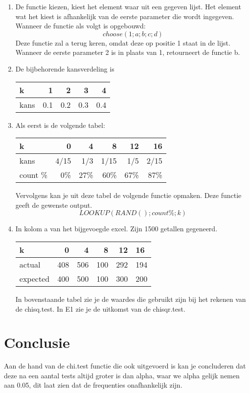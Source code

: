 \documentclass{article}
\begin{document}
\begin{enumerate}[label=(\Alph*)]
\item De functie kiezen, kiest het element waar uit een gegeven lijst. Het element wat het kiest is afhankelijk van de eerste parameter die wordt ingegeven. Wanneer de functie als volgt is opgebouwd:  
  \begin{equation}choose(1;a;b;c;d)\end{equation}
  Deze functie zal a terug keren, omdat deze op positie 1 staat in de lijst. Wanneer de eerste parameter 2 is in plaats van 1, retourneert de functie b.
\item  De bijbehorende kansverdeling is

\begin{table}[h]
  \begin{tabular}{|l|r|r|r|r|}
      \hline
      k & 1 & 2 & 3 & 4 \\ \hline
      kans & 0.1 & 0.2 & 0.3 & 0.4 \\ 
      \hline
  \end{tabular}
\end{table}

\item Als eerst is de volgende tabel:

\begin{table}[h]
  \begin{tabular}{|l|r|r|r|r|r|}
      \hline
      k & 0 & 4 & 8 & 12 & 16 \\ \hline
      kans & 4/15 & 1/3 & 1/15 & 1/5 & 2/15 \\ 
      count \%  & 0\%	& 27\%	& 60\% &	67\%	& 87\% \\
      \hline
  \end{tabular}
\end{table}

Vervolgens kan je uit deze tabel de volgende functie opmaken. Deze functie geeft de gewenste output.
\begin{equation} LOOKUP(RAND();count \%;k) \end{equation}

\item In kolom a van het bijgevoegde excel. Zijn 1500 getallen gegeneerd.

\begin{table}[h]
\begin{tabular}{lrrrrr}
\hline
\multicolumn{1}{|l|}{k}        & 0   & 4   & 8   & 12  & \multicolumn{1}{l|}{16}  \\ \hline
\multicolumn{1}{|l|}{actual}   & 408 & 506 & 100 & 292 & \multicolumn{1}{l|}{194} \\ \cline{2-6} 
\multicolumn{1}{|l|}{expected} & 400 & 500 & 100 & 300 & \multicolumn{1}{l|}{200} \\ \hline     
\end{tabular}
\end{table}

In bovenstaande tabel zie je de waardes die gebruikt zijn bij het rekenen van de chisq.test. In E1 zie je de uitkomst van de chisqr.test. 
\end{enumerate}


\section{Conclusie}
\label{subsec:sample_con}

Aan de hand van de chi.test functie die ook uitgevoerd is kan je concluderen dat deze na een aantal tests altijd groter is dan alpha, waar we alpha gelijk nemen aan 0.05, dit laat zien dat de frequenties onafhankelijk zijn.
\end{document}
